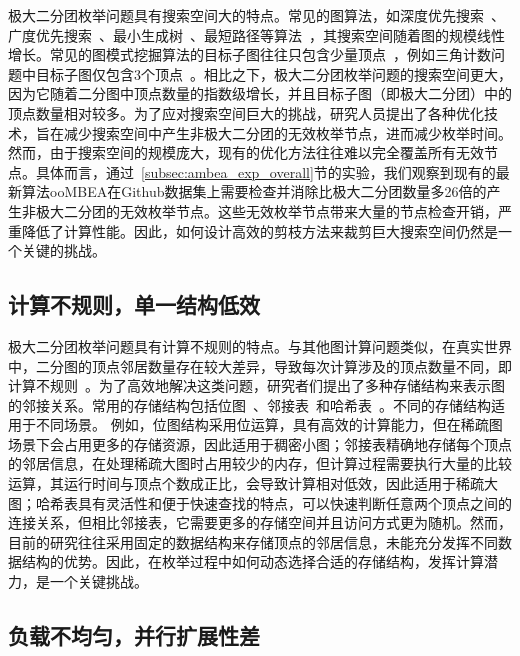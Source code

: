 极大二分团枚举问题具有搜索空间大的特点。常见的图算法，如深度优先搜索~\cite{wiki-dfs}、广度优先搜索~\cite{wiki-bfs}、最小生成树~\cite{wiki-mst}、最短路径等算法~\cite{wiki-sssp}，其搜索空间随着图的规模线性增长。常见的图模式挖掘算法的目标子图往往只包含少量顶点~\cite{peregrine20,pangolin20,g2miner22,decomine22,khuzdul23,gamma23,Graphset23}，例如三角计数问题中目标子图仅包含3个顶点~\cite{triangle18}。相比之下，极大二分团枚举问题的搜索空间更大，因为它随着二分图中顶点数量的指数级增长，并且目标子图（即极大二分团）中的顶点数量相对较多。为了应对搜索空间巨大的挑战，研究人员提出了各种优化技术，旨在减少搜索空间中产生非极大二分团的无效枚举节点，进而减少枚举时间。然而，由于搜索空间的规模庞大，现有的优化方法往往难以完全覆盖所有无效节点。具体而言，通过~\ref{subsec:ambea_exp_overall}节的实验，我们观察到现有的最新算法ooMBEA在Github数据集上需要检查并消除比极大二分团数量多26倍的产生非极大二分团的无效枚举节点。这些无效枚举节点带来大量的节点检查开销，严重降低了计算性能。因此，如何设计高效的剪枝方法来裁剪巨大搜索空间仍然是一个关键的挑战。


\subsection{计算不规则，单一结构低效}

极大二分团枚举问题具有计算不规则的特点。与其他图计算问题类似，在真实世界中，二分图的顶点邻居数量存在较大差异，导致每次计算涉及的顶点数量不同，即计算不规则~\cite{Irregularity12}。为了高效地解决这类问题，研究者们提出了多种存储结构来表示图的邻接关系。常用的存储结构包括位图~\cite{lcm04,lcmmbc07,FCA15,FCA21,FCA22}、邻接表~\cite{iMBEA14,PMBE20,ooMBE22}和哈希表~\cite{parMBE19}。不同的存储结构适用于不同场景。
例如，位图结构采用位运算，具有高效的计算能力，但在稀疏图场景下会占用更多的存储资源，因此适用于稠密小图；邻接表精确地存储每个顶点的邻居信息，在处理稀疏大图时占用较少的内存，但计算过程需要执行大量的比较运算，其运行时间与顶点个数成正比，会导致计算相对低效，因此适用于稀疏大图；哈希表具有灵活性和便于快速查找的特点，可以快速判断任意两个顶点之间的连接关系，但相比邻接表，它需要更多的存储空间并且访问方式更为随机。然而，目前的研究往往采用固定的数据结构来存储顶点的邻居信息，未能充分发挥不同数据结构的优势。因此，在枚举过程中如何动态选择合适的存储结构，发挥计算潜力，是一个关键挑战。



\subsection{负载不均匀，并行扩展性差}

